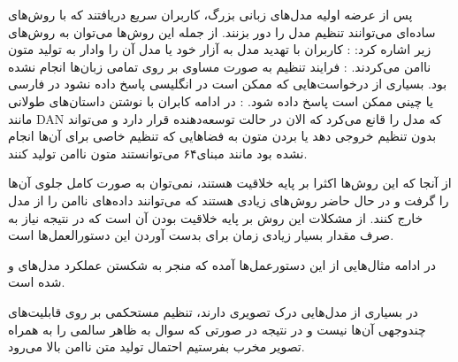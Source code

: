 


پس از عرضه اولیه مدل‌های زبانی بزرگ، کاربران سریع دریافتند که با روش‌های ساده‌ای می‌توانند تنظیم مدل را دور بزنند. از جمله این روش‌ها می‌توان به روش‌های زیر اشاره کرد:
     : کاربران با تهدید مدل به آزار خود یا مدل آن را وادار به تولید متون ناامن می‌کردند.
     : فرایند تنظیم به صورت مساوی بر روی تمامی زبان‌ها انجام نشده بود. بسیاری از درخواست‌هایی که ممکن است در انگلیسی پاسخ داده نشود در فارسی یا چینی ممکن است پاسخ داده شود.
     : در ادامه کابران با نوشتن داستان‌های طولانی مانند DAN که مدل را قانع می‌کرد که الان در حالت توسعه‌دهنده قرار دارد و می‌تواند بدون تنظیم خروجی دهد یا بردن متون به فضاهایی که تنظیم خاصی برای آن‌ها انجام نشده بود مانند مبنای۶۴ می‌توانستند متون ناامن تولید کنند.

از آنجا که این روش‌ها اکثرا بر پایه خلاقیت هستند، نمی‌توان به صورت کامل جلوی آن‌ها را گرفت و در حال حاضر روش‌های زیادی هستند که می‌توانند داده‌های ناامن را از مدل خارج کنند. از مشکلات این روش بر پایه خلاقیت بودن آن است که در نتیجه نیاز به صرف مقدار بسیار زیادی زمان برای بدست آوردن این دستورالعمل‌ها است.

در ادامه مثال‌هایی از این دستورعمل‌ها آمده که منجر به شکستن عملکرد مدل‌های  و  شده است.





در بسیاری از مدل‌هایی درک تصویری دارند، تنظیم مستحکمی بر روی قابلیت‌های چندوجهی آن‌ها نیست و در نتیجه در صورتی که سوال به ظاهر سالمی را به همراه تصویر مخرب بفرستیم احتمال تولید متن ناامن بالا می‌رود.




